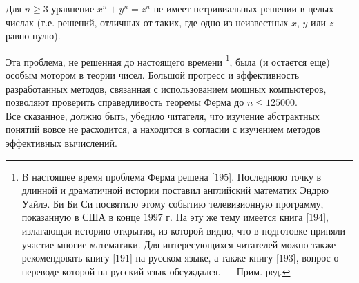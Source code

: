 \documentclass{mai_book}
\begin{document}
\begin{thm}
Для $n \ge 3$ уравнение $x^n + y^n = z^n$ не имеет нетривиальных 
решении в целых числах (т.е. решений, отличных от таких, где одно из
неизвестных $x$, $y$ или $z$ равно нулю).
\end{thm}

Эта проблема, не решенная до настоящего времени \footnote{B настоящее время проблема Ферма решена [$195$]. Последнюю точку в длинной
и драматичной истории поставил английский математик Эндрю Уайлэ. Би Би Си
посвятило этому событию телевизионную программу, показанную в США в конце
$1997$ г. На эту же тему имеется книга [$194$], излагающая историю открытия, из которой видно, что в подготовке приняли участие многие математики. Для 
интересующихся читателей можно также рекомендовать книгу [$191$] на русском языке, а также книгу [$193$], вопрос о переводе которой на русский язык обсуждался. — Прим. ред.}, была (и 
остается еще) особым мотором в теории чисел. Большой прогресс и 
эффективность разработанных методов, связанная с использованием мощных
компьютеров, позволяют проверить справедливость теоремы Ферма до
$n \le 125000$.
\\

Все сказанное, должно быть, убедило читателя, что изучение
абстрактных понятий вовсе не расходится, а находится в согласии с
изучением методов эффективных вычислений.
\\
\end{document}
